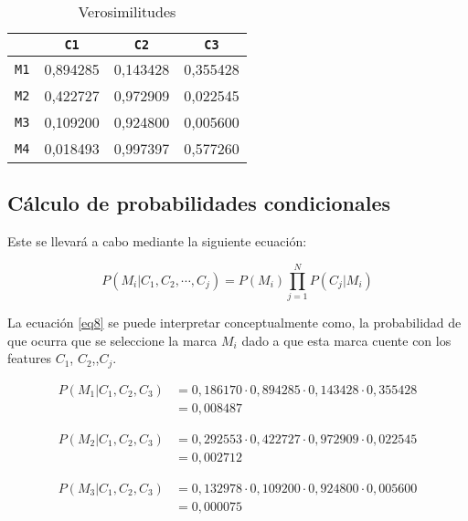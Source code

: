 \documentclass{article}
\begin{document}
\begin{table}[ht]
\caption{Verosimilitudes}
\centering
\begin{tabular}{c | c c c }
\hline
		& \texttt{C1} & \texttt{C2} & \texttt{C3} \\ \hline
\texttt{M1} 	&     0,894285   &   0,143428    &     0,355428     \\
\texttt{M2} 	&     0,422727   &   0,972909    &     0,022545     \\
\texttt{M3} 	&     0,109200   &   0,924800    &     0,005600     \\
\texttt{M4} 	&     0,018493   &   0,997397    &     0,577260     \\ \hline
\end{tabular}
\label{tab:verosimilitudes}
\end{table}

\subsection*{C\'alculo de probabilidades condicionales}
Este se llevar\'a a cabo mediante la siguiente ecuaci\'on:

\begin{equation} \label{eq8}
P(M_{i}|C_{1}, C_{2}, \cdots,
C_{j})=P(M_{i})\prod_{j=1}^{N}P(C_{j}|M_{i})
\end{equation}

La ecuaci\'on \ref{eq8} se puede interpretar conceptualmente como, la
probabilidad de que ocurra que se seleccione la marca $M_{i}$ dado a que esta
marca cuente con los features $C_{1}$, $C_{2}$,\cdots,$C_{j}$.

\begin{equation} \label{des8}
\begin{split}
P(M_{1}|C_{1}, C_{2}, C_{3}) & =
0,186170\cdot0,894285\cdot0,143428\cdot0,355428 \\
& = 0,008487
\end{split}
\end{equation}

\begin{equation} \label{des9}
\begin{split}
P(M_{2}|C_{1}, C_{2}, C_{3}) & =
0,292553\cdot0,422727\cdot0,972909\cdot0,022545 \\
& = 0,002712
\end{split}
\end{equation}

\begin{equation} \label{des10}
\begin{split}
P(M_{3}|C_{1}, C_{2}, C_{3}) & =
0,132978\cdot0,109200\cdot0,924800\cdot0,005600 \\
& = 0,000075
\end{split}
\end{equation}
\end{document}
